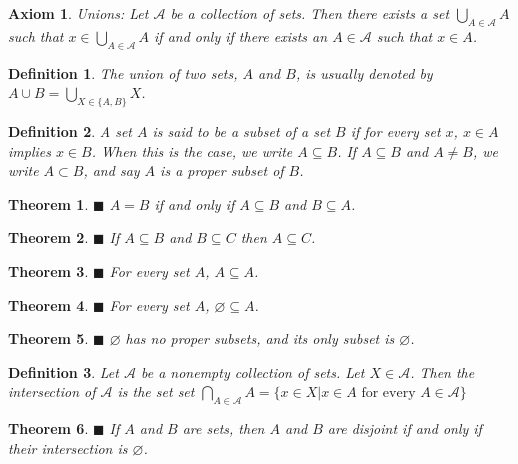 \documentclass[a4paper]{article}
\newtheorem{mytheorem}{Theorem}
\newtheorem{axiom}{Axiom}
\newtheorem{mydef}{Definition}
\numberwithin{mytheorem}{section}
\numberwithin{mydef}{section}
\numberwithin{axiom}{section}
\numberwithin{example}{section}
\newcommand{\done}{$\blacksquare$ }
\begin{document}
\begin{axiom} Unions: Let $\mathcal{A}$ be a collection of sets. Then there exists a set $\bigcup\limits_{A \in \mathcal{A}} A$ such that $x \in \bigcup\limits_{A \in \mathcal{A}} A$ if and only if there exists an $A \in \mathcal{A}$ such that $x \in A$.
\end{axiom}

\begin{mydef} The union of two sets, $A$ and $B$, is usually denoted by $A \cup B = \bigcup\limits_{X \in \{ A,B\}} X$.
\end{mydef}

\begin{mydef} A set $A$ is said to be a subset of a set $B$ if for every set $x$, $x \in A$ implies $x \in B$. When this is the case, we write $A \subseteq B$. If $A \subseteq B$ and $A \neq B$, we write $A \subset B$, and say $A$ is a proper subset of $B$. 
\end{mydef}

\begin{mytheorem} \done $A = B$ if and only if $A \subseteq B$ and $B \subseteq A$. \end{mytheorem}

\begin{mytheorem}\done If $A \subseteq B$ and $B \subseteq C$ then $A \subseteq C$. \end{mytheorem}

\begin{mytheorem}\done For every set $A$, $A \subseteq A$. \end{mytheorem}

\begin{mytheorem} \done For every set $A$, $\varnothing \subseteq A$. \end{mytheorem}

\begin{mytheorem} \done $\varnothing$ has no proper subsets, and its only subset is $\varnothing$. \end{mytheorem}

\begin{mydef} Let $\mathcal{A}$ be a nonempty collection of sets. Let $X \in \mathcal{A}$. Then the intersection of $\mathcal{A}$ is the set set $\bigcap\limits_{A \in \mathcal{A}} A = \{ x \in X | x \in A \text{ for every } A \in \mathcal{A} \}$
\end{mydef}

\begin{mytheorem} \done If $A$ and $B$ are sets, then $A$ and $B$ are disjoint if and only if their intersection is $\varnothing$.  \end{mytheorem}
\end{document}
